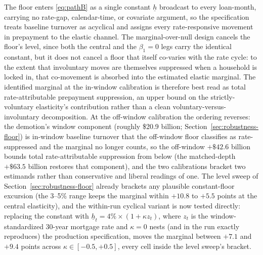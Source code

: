 \documentclass[12pt]{article}
\begin{document}
The floor enters \eqref{eq:pathB} as a single constant $\underline{h}$ broadcast to every loan-month, carrying no rate-gap, calendar-time, or covariate argument, so the specification treats baseline turnover as acyclical and assigns every rate-responsive movement in prepayment to the elastic channel. The marginal-over-null design cancels the floor's level, since both the central and the $\beta_1 = 0$ legs carry the identical constant, but it does not cancel a floor that itself co-varies with the rate cycle: to the extent that involuntary moves are themselves suppressed when a household is locked in, that co-movement is absorbed into the estimated elastic marginal. The identified marginal at the in-window calibration is therefore best read as total rate-attributable prepayment suppression, an upper bound on the strictly-voluntary elasticity's contribution rather than a clean voluntary-versus-involuntary decomposition. At the off-window calibration the ordering reverses: the demotion's window component (roughly \$20.9 billion; Section~\ref{sec:robustness-floor}) is in-window baseline turnover that the off-window floor classifies as rate-suppressed and the marginal no longer counts, so the off-window $+\$42.6$ billion bounds total rate-attributable suppression from below (the matched-depth $+\$63.5$ billion restores that component), and the two calibrations bracket two estimands rather than conservative and liberal readings of one. The level sweep of Section~\ref{sec:robustness-floor} already brackets any plausible constant-floor excursion (the 3--5\% range keeps the marginal within $+10.8$ to $+5.5$ points at the central elasticity), and the within-run cyclical variant is now tested directly: replacing the constant with $\underline{h}_t = 4\% \times (1 + \kappa z_t)$, where $z_t$ is the window-standardized 30-year mortgage rate and $\kappa = 0$ nests (and in the run exactly reproduces) the production specification, moves the marginal between $+7.1$ and $+9.4$ points across $\kappa \in [-0.5, +0.5]$, every cell inside the level sweep's bracket.
\end{document}
